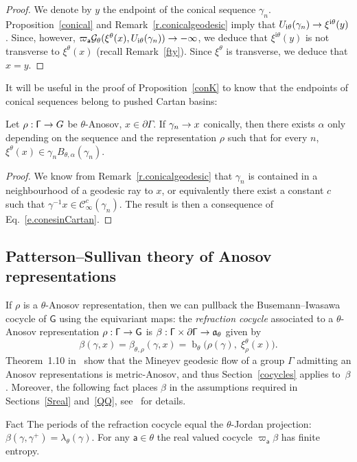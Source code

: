 \documentclass[AHL,Unicode,longabstracts,MathTools]{cedram}
\DeclareMathOperator{\bus}{b}
\newcommand{\ii}{\mathrm{i}}
\renewcommand{\sf}[1]{{\mathsf{#1}}}
\newcommand{\sroot}{{\sf{a}}}
\newcommand{\sfG}{\sf{G}}
\newcommand{\G}{\sf{\Gamma}}
\newcommand{\cal}{\mathcal}
\newcommand{\Gr}{\cal{G}}
\newcommand{\cone}{\cal{C}}
\newcommand{\g}{\gamma}
\renewcommand{\t}{\theta}
\newcommand{\bord}{\partial}
\newcommand{\peso}{\varpi}
\newcommand{\rfr}{\beta}
\renewcommand{\/}{\backslash}
\newcommand{\<}{\langle}
\renewcommand{\>}{\rangle}
\renewcommand{\a}{\mathfrak{a}}
\renewcommand*{\to}{\mathchoice{\longrightarrow}{\rightarrow}{\rightarrow}{\rightarrow}}
\begin{document}
\begin{proof}
We denote by $y$ the endpoint of the conical sequence $\g_n$. Proposition~\ref{conical} and Remark~\ref{r.conicalgeodesic} imply that $U_{\ii\t}(\g_n)\to\xi^{\ii\t}(y)$. Since, however, $\peso_\sroot\Gr_\t(\xi^\t(x),U_{\ii\t}(\g_n))\to-\infty$, we deduce that $\xi^{\ii\t}(y)$ is not transverse to $\xi^\t(x)$ (recall Remark~\ref{fty}). Since $\xi^\t$ is transverse, we deduce that $x=y$.
\end{proof}

It will be useful in the proof of Proposition~\ref{conK} to know that the endpoints of conical sequences belong to pushed Cartan basins:

\begin{lemm}\label{l.conicbasin}
Let $\rho:\G\to G$ be $\theta$-Anosov, $x\in\bord\G$. If $\g_n\to x$ conically, then there exists $\alpha$ only depending on the sequence and the representation $\rho$ such that for every $n$, $\xi^\theta(x)\in \g_nB_{\t,\alpha}(\g_n)$.
\end{lemm}

\begin{proof}
We know from Remark~\ref{r.conicalgeodesic} that $\g_n$ is contained in a neighbourhood of a geodesic ray to $x$, or equivalently there exist a constant $c$ such that $\gamma^{-1}x\in\cone^{c}_\infty(\gamma_n)$. The result is then a consequence of Eq.~\eqref{e.conesinCartan}.
\end{proof}

\subsection{Patterson--Sullivan theory of Anosov representations}\label{rfr}
If $\rho$ is a $\t$-Anosov representation, then we can pullback the Busemann--Iwasawa cocycle of $\sfG$ using the equivariant maps: the \emph{refraction cocycle} associated to a $\t$-Anosov representation $\rho:\G\to\sfG$ is $\rfr:\G\times\bord\G\to\a_\t$ given by
\[
\rfr(\g,x)=\rfr_{\t,\rho}(\g,x)=\bus_\t\bigl(\rho(\g),\;\xi^\t_\rho(x)\bigr).
\]
Theorem~1.10 in~\cite{pressure} show that the Mineyev geodesic flow of a group $\G$ admitting an Anosov representations is metric-Anosov, and thus Section~\ref{cocycles} applies to~$\rfr$. Moreover, the following fact places $\rfr$ in the assumptions required in Sections~\ref{Sreal} and~\ref{QQ}, see~\cite{dichotomy} for details.

\begin{enonce}{Fact}
The periods of the refraction cocycle equal the $\theta$-Jordan projection: $\rfr(\g,\g^+)=\lambda_\t(\g)$. For any $\sroot\in\t$ the real valued cocycle $\peso_\sroot\rfr$ has finite entropy.
\end{enonce}
\end{document}
